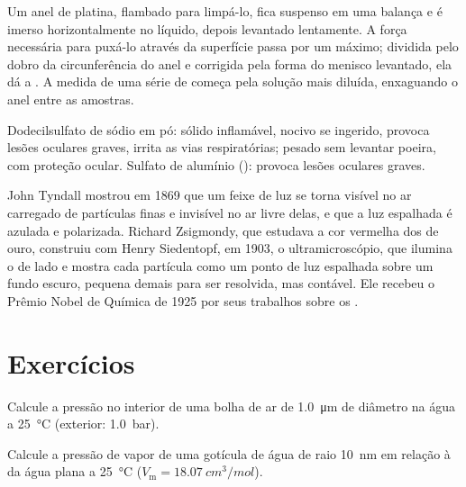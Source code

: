 \begin{inthelab}
Um anel de platina, flambado para limpá-lo, fica suspenso em uma balança e é imerso
horizontalmente no líquido, depois levantado lentamente. A força necessária para
puxá-lo através da superfície passa por um máximo; dividida pelo dobro da
circunferência do anel e corrigida pela forma do menisco levantado, ela dá a . A medida de uma série de  começa pela solução mais diluída,
enxaguando o anel entre as amostras.
\end{inthelab}

\begin{safety}{}
Dodecilsulfato de sódio em pó: sólido inflamável, nocivo se ingerido, provoca lesões
oculares graves, irrita as vias respiratórias; pesado sem levantar poeira, com
proteção ocular. Sulfato de alumínio (): provoca lesões oculares
graves.
\end{safety}

\begin{history}
John Tyndall mostrou em 1869 que um feixe de luz se torna visível no ar carregado de
partículas finas e invisível no ar livre delas, e que a luz espalhada é azulada e
polarizada. Richard Zsigmondy, que estudava a cor vermelha dos  de ouro,
construiu com Henry Siedentopf, em 1903, o ultramicroscópio, que ilumina o  de
lado e mostra cada partícula como um ponto de luz espalhada sobre um fundo escuro,
pequena demais para ser resolvida, mas contável. Ele recebeu o Prêmio Nobel de
Química de 1925 por seus trabalhos sobre os .
\end{history}

\section{Exercícios}

\begin{exercise}[$\star$]\label{exo:b3:colloids:1}
Calcule a pressão no interior de uma bolha de ar de \qty{1.0}{\micro m} de diâmetro na água
a \qty{25}{\celsius} (exterior: \qty{1.0}{bar}).
\end{exercise}

\begin{exercise}[$\star$]\label{exo:b3:colloids:2}
Calcule a pressão de vapor de uma gotícula de água de raio \qty{10}{nm} em relação à da
água plana a \qty{25}{\celsius} ($V_{\mathrm m} = \qty{18.07}{cm^3/mol}$).
\end{exercise}

